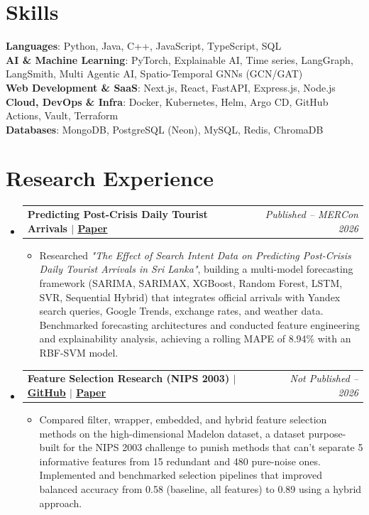 \documentclass[a4paper,10pt]{article}
\makeatletter
\newcommand{\resumeItem}[1]{\item\small{#1}}
\newcommand{\resumeProjectHeading}[2]{
  \vspace{-1pt}\item
    \begin{tabular*}{0.97\textwidth}{l@{\extracolsep{\fill}}r}
      \textbf{#1} & \textit{\small #2} \\
    \end{tabular*}\vspace{-5pt}
}
\makeatother
\begin{document}
\section{Skills}
\begin{itemize}[leftmargin=0.15in, label={}]
    \small{\item{
        \textbf{Languages}{: Python, Java, C++, JavaScript, TypeScript, SQL} \\
        \textbf{AI \& Machine Learning}{: PyTorch, Explainable AI, Time series, LangGraph, LangSmith, Multi Agentic AI, Spatio-Temporal GNNs (GCN/GAT)} \\
        \textbf{Web Development \& SaaS}{: Next.js, React, FastAPI, Express.js, Node.js} \\
        \textbf{Cloud, DevOps \& Infra}{: Docker, Kubernetes, Helm, Argo CD, GitHub Actions, Vault, Terraform} \\
        \textbf{Databases}{: MongoDB, PostgreSQL (Neon), MySQL, Redis, ChromaDB}
    }}
\end{itemize}

\section{Research Experience}
\begin{itemize}[leftmargin=0.15in, label={}]

    \resumeProjectHeading
      {Predicting Post-Crisis Daily Tourist Arrivals $|$ \href{https://doi.org/10.1109/MERCon71835.2026.11691456}{\underline{Paper}}}{Published -- MERCon 2026}
      \begin{itemize}[leftmargin=0.15in, label={\tiny$\bullet$}]
        \resumeItem{Researched \textit{"The Effect of Search Intent Data on Predicting Post-Crisis Daily Tourist Arrivals in Sri Lanka"}, building a multi-model forecasting framework (SARIMA, SARIMAX, XGBoost, Random Forest, LSTM, SVR, Sequential Hybrid) that integrates official arrivals with Yandex search queries, Google Trends, exchange rates, and weather data. Benchmarked forecasting architectures and conducted feature engineering and explainability analysis, achieving a rolling MAPE of 8.94\% with an RBF-SVM model.}
      \end{itemize}

    \resumeProjectHeading
      {Feature Selection Research (NIPS 2003) $|$ \href{https://github.com/Jaybro-git/Feature-Selection-Research-NIPS-2003}{\underline{GitHub}} $|$ \href{https://cdn.jsdelivr.net/gh/Jaybro-git/Research-Papers@main/Feature_Selection_for_High_Dimensional_Noisy_Data_Research_Paper.pdf}{\underline{Paper}}}{Not Published -- 2026}
      \begin{itemize}[leftmargin=0.15in, label={\tiny$\bullet$}]
        \resumeItem{Compared filter, wrapper, embedded, and hybrid feature selection methods on the high-dimensional Madelon dataset, a dataset purpose-built for the NIPS 2003 challenge to punish methods that can't separate 5 informative features from 15 redundant and 480 pure-noise ones. Implemented and benchmarked selection pipelines that improved balanced accuracy from 0.58 (baseline, all features) to 0.89 using a hybrid approach.}
      \end{itemize}

\end{itemize}
\end{document}

